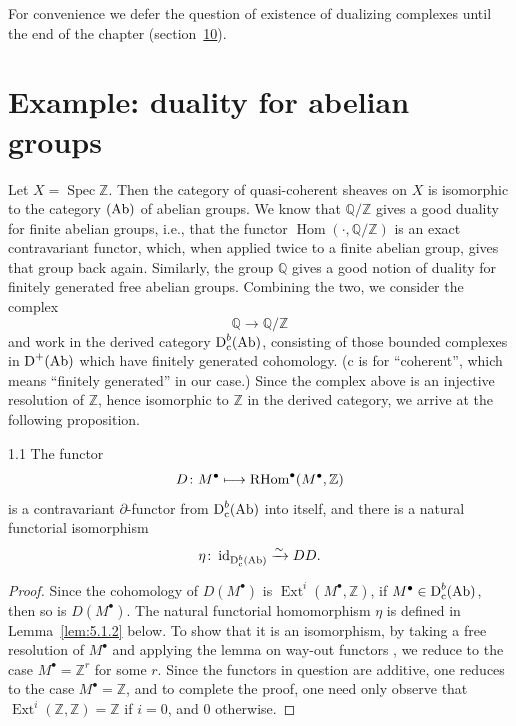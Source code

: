 For convenience we defer the question of existence of dualizing complexes until the end of the chapter (section~\hyperref[sec:5.10]{10}).

\section{Example: duality for abelian groups}\label{sec:5.1}

Let $X=\operatorname{Spec}\mathbb{Z}$. Then the category of quasi-coherent sheaves on $X$ is isomorphic to the category $(\operatorname{Ab})$ of abelian groups. We know that $\mathbb{Q}/\mathbb{Z}$ gives a good duality for finite abelian groups, i.e., that the functor $\operatorname{Hom}(\cdot,\mathbb{Q}/\mathbb{Z})$ is an exact contravariant functor, which, when applied twice to a finite abelian group, gives that group back again. Similarly, the group $\mathbb{Q}$ gives a good notion of duality for finitely generated free abelian groups. Combining the two, we consider the complex
\[
\mathbb{Q}\longrightarrow \mathbb{Q}/\mathbb{Z}
\]
and work in the derived category $\operatorname{D}_{\mathrm{c}}^{b}(\operatorname{Ab})$, consisting of those bounded complexes in $\operatorname{D}^{+}(\operatorname{Ab})$ which have finitely generated cohomology. ($\mathrm{c}$ is for ``coherent'', which means ``finitely generated'' in our case.) Since the complex above is an injective resolution of $\mathbb{Z}$, hence isomorphic to $\mathbb{Z}$ in the derived category, we arrive at the following proposition.

\begin{bookproposition}{1.1}\label{prop:5.1.1}
The functor
\[
D\colon M^{\bullet}\longmapsto \operatorname{RHom}^\bullet(M^{\bullet},\mathbb{Z})
\]
is a contravariant $\partial$-functor from $\operatorname{D}_{\mathrm{c}}^{b}(\operatorname{Ab})$ into itself, and there is a natural functorial isomorphism
\[
\eta\colon \operatorname{id}_{\operatorname{D}_{\mathrm{c}}^{b}(\operatorname{Ab})}\xrightarrow{\sim} DD.
\]
\end{bookproposition}

\begin{proof}
Since the cohomology of $D(M^{\bullet})$ is $\operatorname{Ext}^{i}(M^{\bullet},\mathbb{Z})$, if $M^{\bullet}\in\operatorname{D}^{b}_{\mathrm{c}}(\operatorname{Ab})$, then so is $D(M^{\bullet})$. The natural functorial homomorphism $\eta$ is defined in Lemma~\ref{lem:5.1.2} below. To show that it is an isomorphism, by taking a free resolution of $M^{\bullet}$ and applying the lemma on way-out functors , we reduce to the case $M^{\bullet}=\mathbb{Z}^{r}$ for some $r$. Since the functors in question are additive, one reduces to the case $M^{\bullet}=\mathbb{Z}$, and to complete the proof, one need only observe that $\operatorname{Ext}^{i}(\mathbb{Z},\mathbb{Z})=\mathbb{Z}$ if $i=0$, and $0$ otherwise.
\end{proof}

